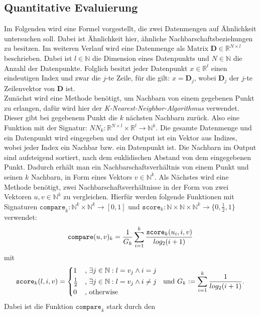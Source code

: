 \documentclass[12pt,letterpaper,ngerman]{article}
\begin{document}
\subsection{Quantitative Evaluierung} 
Im Folgenden wird eine Formel vorgestellt, die zwei Datenmengen
auf Ähnlichkeit untersuchen soll. Dabei ist Ähnlichkeit hier,
ähnliche Nachbarschaftsbeziehungen zu besitzen. Im weiteren Verlauf
wird
eine Datenmenge als Matrix  $\mathbf{D} \in \mathbb{R}^{N\times l}$
beschrieben. Dabei ist $l \in \mathbb{N}$ die Dimension eines
Datenpunkts und $N \in \mathbb{N}$ die Anzahl der Datenpunkte. 
Folglich besitzt jeder Datenpunkt $x \in \mathbb{R}^l$ einen 
eindeutigen Index und zwar die $j$-te Zeile, für die gilt:
$x = \mathbf{D}_j$,  wobei $\mathbf{D}_j$  der $j$-te Zeilenvektor 
von $\mathbf{D}$ ist.\\ 
Zunächst wird eine Methode benötigt, um Nachbarn von einem gegebenen
Punkt zu erlangen, dafür wird hier der
\textit{K-Nearest-Neighbor-Algorithmus} verwendet. Dieser gibt bei
gegebenem Punkt die $k$ nächsten Nachbarn zurück. Also eine Funktion
mit der Signatur:
$NN_k: \mathbb{R}^{N\times l} \times \mathbb{R}^{l} \to \mathbb{N}^k$. 
Die gesamte Datenmenge und ein Datenpunkt wird eingegeben und der 
Output ist ein Vektor aus Indizes, wobei jeder Index ein Nachbar 
bzw. ein Datenpunkt ist.
Die Nachbarn im Output sind aufsteigend sortiert, nach dem 
euklidischen Abstand 
von dem eingegebenen Punkt. Dadurch erhält man ein 
Nachbarschaftsverhältnis von einem Punkt
und seinen $k$ Nachbarn, in Form eines Vektors
$v \in \mathbb{N}^k$.
Als Nächstes wird eine Methode benötigt, zwei 
Nachbarschaftsverhältnisse in der Form von zwei Vektoren
$u, v \in \mathbb{N}^k$ zu vergleichen.
Hierfür werden folgende Funktionen mit Signaturen
$\texttt{compare}_k:\mathbb{N}^k \times \mathbb{N}^k \to [0,1]$ 
und $\texttt{score}_k: \mathbb{N} \times \mathbb{N} \times
\mathbb{N}^k \to \{0, \frac{1}{2}, 1\}$
verwendet:
\[
    \verb|compare|(u,v)_k = 
      \frac{1}{G_k} \sum^{k}_{i=1} 
      \frac{ \texttt{score}_{k}(u_i,i,v)}{log_2(i+1)}
\]
mit
\[
  \texttt{score}_k(l,i,v) = \begin{cases*} 
      1 & , $\exists j \in \mathbb{N}: l = v_j \land i = j$   \\
      \frac{1}{2} & , $\exists j \in \mathbb{N}: l = v_j \land i \neq j$\\
      0   & , \text{otherwise}
    \end{cases*}  \text{  und  }
    G_k := \sum_{i=1}^{k} \frac{1}{log_2(i+1)}.
\]
Dabei ist die Funktion $\texttt{compare}_k$ stark durch den
\end{document}
